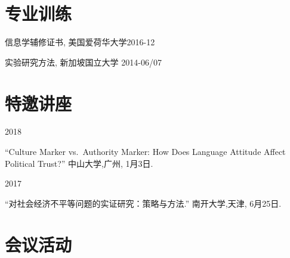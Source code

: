 \documentclass[10.5pt,]{article}
\providecommand{\tightlist}{%
	\setlength{\itemsep}{0pt}\setlength{\parskip}{0pt}}
\renewenvironment{itemize}{
	\begin{list}{}{
			\setlength{\leftmargin}{1.5em}
		}
	}{
	\end{list}
}
\begin{document}
\section{专业训练}

\begin{itemize}
\tightlist
\item
  信息学辅修证书, 美国爱荷华大学\hfill 2016-12
\item
  实验研究方法, 新加坡国立大学 \hfill 2014-06/07
\end{itemize}

\section{特邀讲座}

\begin{itemize}
\tightlist
\item
  2018

  \begin{itemize}
  \tightlist
  \item
    ``Culture Marker vs.~Authority Marker: How Does Language Attitude
    Affect Political Trust?'' 中山大学,广州, 1月3日.
  \end{itemize}
\item
  2017

  \begin{itemize}
  \tightlist
  \item
    ``对社会经济不平等问题的实证研究：策略与方法.'' 南开大学,天津,
    6月25日.
  \end{itemize}
\end{itemize}

\section{会议活动}
\end{document}
